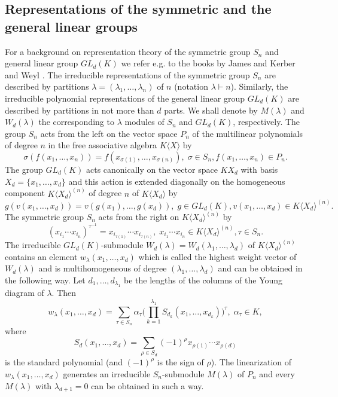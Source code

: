\documentclass{amsart}
\theoremstyle{definition}
\begin{document}
\subsection{Representations of the symmetric and the general linear groups}
For a background on representation theory of the symmetric group $S_n$ and general linear group $GL_d(K)$ we refer e.g. to the books by James and Kerber \cite{JK} and Weyl \cite{W}.
The irreducible representations of the symmetric group $S_n$ are described by partitions $\lambda=(\lambda_1,\ldots,\lambda_n)$ of $n$ (notation $\lambda\vdash n$).
Similarly, the irreducible polynomial representations of the general linear group $GL_d(K)$ are described by partitions in not more than $d$ parts.
We shall denote by $M(\lambda)$ and $W_d(\lambda)$ the corresponding to $\lambda$ modules of $S_n$ and $GL_d(K)$, respectively.
The group $S_n$ acts from the left on the vector space $P_n$ of the multilinear polynomials of degree $n$ in the free associative algebra $K\langle X\rangle$ by
\[
\sigma(f(x_1,\ldots,x_n))=f(x_{\sigma(1)},\ldots, x_{\sigma(n)}),\;\sigma\in S_n,f(x_1,\ldots,x_n)\in P_n.
\]
The group $GL_d(K)$ acts canonically on the vector space $KX_d$ with basis $X_d=\{x_1,\ldots,x_d\}$
and this action is extended diagonally on the homogeneous component $K\langle X_d\rangle^{(n)}$ of degree $n$ of $K\langle X_d\rangle$ by
\[
g(v(x_1,\ldots,x_d))=v(g(x_1),\ldots,g(x_d)),\;g\in GL_d(K),v(x_1,\ldots,x_d)\in K\langle X_d\rangle^{(n)}.
\]
The symmetric group $S_n$ acts from the right on $K\langle X_d\rangle^{(n)}$ by
\[
(x_{i_1}\cdots x_{i_n})^{\tau^{-1}}=x_{i_{\tau(1)}}\cdots x_{i_{\tau(n)}},\;x_{i_1}\cdots x_{i_n}\in K\langle X_d\rangle^{(n)}, \tau\in S_n.
\]
The irreducible $GL_d(K)$-submodule $W_d(\lambda)=W_d(\lambda_1,\ldots,\lambda_d)$ of $K\langle X_d\rangle^{(n)}$ contains an element $w_{\lambda}(x_1,\ldots,x_d)$
which is called the highest weight vector of $W_d(\lambda)$ and is multihomogeneous of degree $(\lambda_1,\ldots,\lambda_d)$ and can be obtained in the following way.
Let $d_1,\ldots,d_{\lambda_1}$ be the lengths of the columns of the Young diagram of $\lambda$. Then
\[
w_{\lambda}(x_1,\ldots,x_d)=\sum_{\tau\in S_n}\alpha_{\tau}\big(\prod_{k=1}^{\lambda_1}S_{d_k}(x_1,\ldots,x_{d_k})\big)^{\tau},\;\alpha_{\tau}\in K,
\]
where
\[
S_d(x_1,\ldots,x_d)=\sum_{\rho\in S_d}(-1)^{\rho}x_{\rho(1)}\cdots x_{\rho(d)}
\]
is the standard polynomial (and $(-1)^{\rho}$ is the sign of $\rho$).
The linearization of $w_{\lambda}(x_1,\ldots,x_d)$ generates an irreducible $S_n$-submodule $M(\lambda)$ of $P_n$ and every $M(\lambda)$ with $\lambda_{d+1}=0$
can be obtained in such a way.
\end{document}
